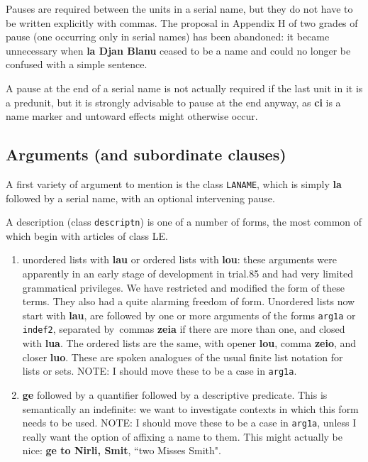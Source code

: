 \documentclass[12pt]{book}
\begin{document}
{\begin{enumerate}
\end{enumerate}

Pauses are required between the units in a serial name, but they do not have to be written explicitly with commas.  The proposal in Appendix H of two grades of pause
(one occurring only in serial names) has been abandoned:  it became unnecessary when {\bf la Djan Blanu} ceased to be a name and could no longer be confused with a simple sentence.

A pause at the end of a serial name is not actually required if the last unit in it is a predunit, but it is strongly advisable to pause at the end anyway, as {\bf ci} is a name marker and untoward effects might otherwise occur.

\subsection{Arguments (and subordinate clauses)}

A first variety of argument to mention is the class {\tt LANAME}, which is simply {\bf la} followed by a serial name, with an optional intervening pause.

A description  (class {\tt descriptn}) is one of a number of forms, the most common of which begin with articles of class LE.

\begin{enumerate}

\item unordered lists with {\bf lau} or ordered lists with {\bf lou}:   these arguments were apparently in an early stage of development in trial.85 and had very limited grammatical privileges.  We have restricted and modified the form of these terms.  They also had a quite alarming freedom of form.  Unordered lists now start with {\bf lau}, are followed by one or more arguments of the forms {\tt arg1a} or {\tt indef2}, separated by\
commas {\bf zeia} if there are more than one, and closed with {\bf lua}.  The ordered lists are the same, with opener {\bf lou}, comma {\bf zeio}, and closer {\bf luo}.  These are spoken analogues of the usual finite list notation for lists or sets.  NOTE:  I should move these to be a case in {\tt arg1a}.


\item {\bf ge} followed by a quantifier followed by a descriptive predicate.  This is semantically an indefinite:  we want to  investigate contexts in which this form needs to be used.   NOTE:  I should move these to be a case in {\tt arg1a}, unless I really want the option of affixing a name to them.  This might actually be nice:  {\bf ge to Nirli, Smit}, ``two Misses Smith".


\end{enumerate}}
\end{document}
